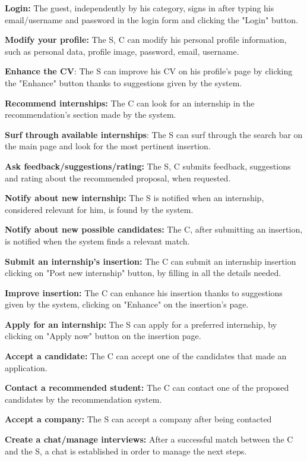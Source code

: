 \textbf{Login:} The guest, independently by his category, signs in after
typing his email/username and password in the login form and clicking
the "Login" button.

\textbf{Modify your profile:} The S, C can modify his personal profile
information, such as personal data, profile image, password, email,
username.

\textbf{Enhance the CV}: The S can improve his CV on his
profile's page by clicking the "Enhance" button thanks
to suggestions given by the system.

\textbf{Recommend internships:} The C can look for an internship in the
recommendation's section made by the system.

\textbf{Surf through available internships}: The S can surf through the
search bar on the main page and look for the most pertinent insertion.

\textbf{Ask feedback/suggestions/rating:} The S, C submits feedback,
suggestions and rating about the recommended proposal, when requested.

\textbf{Notify about new internship:} The S is notified when an
internship, considered relevant for him, is found by the system.

\textbf{Notify about new possible candidates:} The C, after submitting
an insertion, is notified when the system finds a relevant match.

\textbf{Submit an internship's insertion:} The C can submit an
internship insertion clicking on "Post new internship" button, by
filling in all the details needed.

\textbf{Improve insertion:} The C can enhance his insertion thanks to
suggestions given by the system, clicking on "Enhance" on the
insertion's page.

\textbf{Apply for an internship:} The S can apply for a preferred
internship, by clicking on "Apply now" button on the insertion page.

\textbf{Accept a candidate:} The C can accept one of the candidates that
made an application.

\textbf{Contact a recommended student:} The C can contact one of the
proposed candidates by the recommendation system.

\textbf{Accept a company:} The S can accept a company after being
contacted

\textbf{Create a chat/manage interviews:} After a successful match
between the C and the S, a chat is established in order to manage the
next steps.

